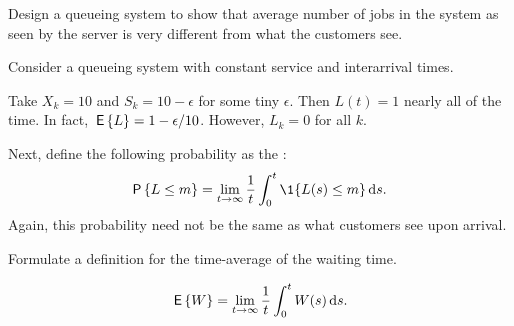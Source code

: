 \begin{exercise}
Design a queueing system to show that average number of jobs in the system as seen by the server is very different from what the customers see.
  \begin{hint}
Consider a queueing system with constant service and interarrival times.
  \end{hint}
\begin{solution}
  Take $X_k = 10$ and $S_k = 10-\epsilon$ for some tiny
  $\epsilon$. Then $L(t) = 1$ nearly all of the time. In fact,
  $\,\mathsf{E}\left\{L\right\} = 1-\epsilon/10$. However, $L_k=0$ for all $k$.
\end{solution}
\end{exercise}

Next, define the following probability as the
:
\begin{equation}
  \label{eq:47}
  \P{L\leq m} =\lim_{t\to\infty} \frac 1 t\int_0^t \1{L(s)\leq m} \d s.
\end{equation}
Again, this probability need not be the same as what customers see
upon arrival.  

\begin{exercise}
Formulate a definition  for the  time-average of the waiting time.
\begin{solution}
  \begin{equation*}
    \,\mathsf{E}\left\{W\right\} = \lim_{t\to\infty} \frac1t \int_0^t W(s) \,\text{d}s.
  \end{equation*}
\end{solution}
\end{exercise}



